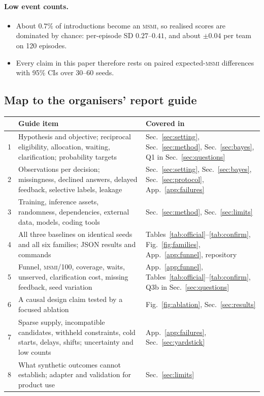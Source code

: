 \documentclass[10pt]{article}
\newcommand{\msmi}{\textsc{msmi}}
\begin{document}
\paragraph{Low event counts.}
\begin{itemize}
\item About $0.7\%$ of introductions become an \msmi, so realised scores are dominated by chance: per-episode SD $0.27$--$0.41$, and about $\pm0.04$ per team on 120 episodes.
\item Every claim in this paper therefore rests on paired expected-\msmi{} differences with 95\% CIs over 30--60 seeds.
\end{itemize}

\clearpage
\subsection{Map to the organisers' report guide}\label{app:checklist}

\begin{center}\small
{}
\label{tab:checklist}
\begin{tabularx}{\linewidth}{@{}lXl@{}}
\toprule
& Guide item & Covered in \\
\midrule
1 & Hypothesis and objective; reciprocal eligibility, allocation, waiting, clarification; probability targets & Sec.~\ref{sec:setting}, Sec.~\ref{sec:method}, Sec.~\ref{sec:bayes}, Q1 in Sec.~\ref{sec:questions} \\
2 & Observations per decision; missingness, declined answers, delayed feedback, selective labels, leakage & Sec.~\ref{sec:setting}, Sec.~\ref{sec:bayes}, Sec.~\ref{sec:protocol}, App.~\ref{app:failures} \\
3 & Training, inference assets, randomness, dependencies, external data, models, coding tools & Sec.~\ref{sec:method}, Sec.~\ref{sec:limits} \\
4 & All three baselines on identical seeds and all six families; JSON results and commands & Tables~\ref{tab:official}--\ref{tab:confirm}, Fig.~\ref{fig:families}, App.~\ref{app:funnel}, repository \\
5 & Funnel, \msmi/100, coverage, waits, unserved, clarification cost, missing feedback, seed variation & App.~\ref{app:funnel}, Tables~\ref{tab:official}--\ref{tab:confirm}, Q3b in Sec.~\ref{sec:questions} \\
6 & A causal design claim tested by a focused ablation & Fig.~\ref{fig:ablation}, Sec.~\ref{sec:results} \\
7 & Sparse supply, incompatible candidates, withheld constraints, cold starts, delays, shifts; uncertainty and low counts & App.~\ref{app:failures}, Sec.~\ref{sec:yardstick} \\
8 & What synthetic outcomes cannot establish; adapter and validation for product use & Sec.~\ref{sec:limits} \\
\bottomrule
\end{tabularx}
\end{center}
\end{document}
